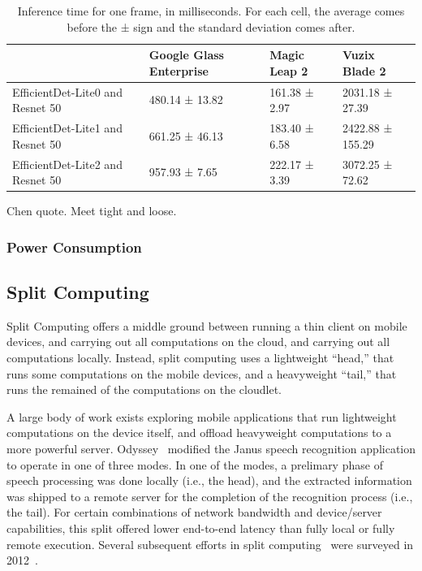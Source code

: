 \begin{table}
\begin{tabular}{|l||l|l|l|}
  \hline
  & Google Glass Enterprise & Magic Leap 2 & Vuzix Blade 2\\
  \hline
  \hline
  EfficientDet-Lite0 and Resnet 50 & 480.14 ± 13.82 & 161.38 ± 2.97 & 2031.18 ± 27.39\\
  EfficientDet-Lite1 and Resnet 50 & 661.25 ± 46.13 & 183.40 ± 6.58 & 2422.88 ± 155.29\\
  EfficientDet-Lite2 and Resnet 50 & 957.93 ± 7.65 & 222.17 ± 3.39 & 3072.25 ± 72.62\\
  \hline
\end{tabular}
  \caption{
    Inference time for one frame, in milliseconds.
    For each cell, the average comes before the ± sign and the standard
    deviation comes after.
  }\label{tab:mobile_inference}
\end{table}

Chen quote. Meet tight and loose.

\subsubsection{Power Consumption}

\subsection{Split Computing}

Split Computing offers a middle ground between running a thin client on mobile
devices, and carrying out all computations on the cloud, and carrying out all
computations locally.
Instead, split computing uses a lightweight ``head,'' that runs some
computations on the mobile devices, and a heavyweight ``tail,'' that runs the
remained of the computations on the cloudlet.

A large body of work exists exploring mobile applications that run lightweight
computations on the device itself, and offload heavyweight computations to a
more powerful server.
Odyssey~\cite{Noble1997} modified the Janus speech recognition application to
operate in one of three modes.
In one of the modes, a prelimary phase of speech
processing was done locally (i.e., the head), and the extracted
information was shipped to a remote server for the completion of the
recognition process (i.e., the tail).
For certain combinations of
network bandwidth and device/server capabilities, this split offered
lower end-to-end latency than fully local or fully remote execution.
Several subsequent efforts in split computing~\cite{Balan2002, Flinn2001,
  Flinn2003b, Narayanan2003, Goyal2004, Su2005, Ok2007, Balan2007,
  Kristensen2008} were surveyed in 2012~\cite{Flinn2012}.

